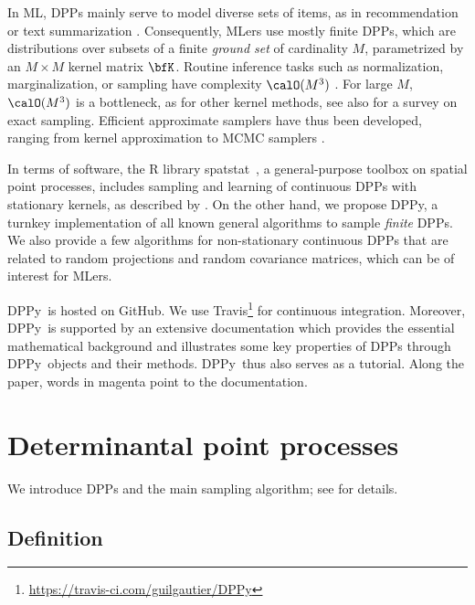 \documentclass[twoside,11pt]{article}
\makeatletter
\newcommand{\DPPy}{\textsf{DPPy}}
\newcommand\footnoteref[1]{\protected@xdef\@thefnmark{\ref{#1}}\@footnotemark}
\makeatother
\begin{document}
In ML, DPPs mainly serve to model diverse sets of items, as in recommendation \citep{KaDeKo16, GaPaKo16} or text summarization \citep{DuBa18}.
Consequently, MLers  use mostly finite DPPs, which are distributions over subsets of a finite \emph{ground set} of cardinality $M$, parametrized by an $M\times M$ kernel matrix $\bfK$.
Routine inference tasks such as normalization, marginalization, or sampling have complexity $\calO(M^3)$ \citep{KuTa12}.
For large $M$, $\calO(M^3)$ is a bottleneck, as for other kernel methods, see also \citet{TrBaAm18} for a survey on exact sampling.
Efficient approximate samplers have thus been developed, ranging from kernel approximation \citep{AKFT13} to MCMC samplers \citep{AnGhRe16, LiJeSr16c, GaBaVa17}.

In terms of software, the R library \textsf{spatstat}\ \citep{BaTu05}, a general-purpose toolbox on spatial point processes, includes sampling and learning of continuous DPPs with stationary kernels, as described by \citet{LaMoRu15}.
On the other hand, we propose \DPPy, a turnkey implementation of all known general algorithms to sample \emph{finite} DPPs.
We also provide a few algorithms for non-stationary continuous DPPs that are related to random projections and random covariance matrices, which can be of interest for MLers.

\DPPy\ is hosted on GitHub.\footnoteref{fn:github} We use \setcounter{footnote}{5}Travis\footnote{\url{https://travis-ci.com/guilgautier/DPPy}} for continuous integration.
Moreover, \DPPy\ is supported by an extensive documentation\footnoteref{fn:docs} which provides the essential mathematical background and illustrates some key properties of DPPs through \DPPy\ objects and their methods.
\DPPy\ thus also serves as a tutorial.
Along the paper, words in magenta point to the documentation.


\section{Determinantal point processes} %
\label{sec:determinantal_point_processes}

	We introduce DPPs and the main sampling algorithm; see \citet{HKPV06} for details.

	\subsection{Definition} %
	\label{sub:definition}
\end{document}
